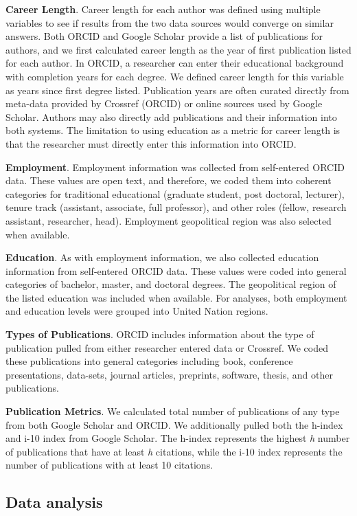 \documentclass[
  english,
  man]{apa6}
\begin{document}
\textbf{Career Length}. Career length for each author was defined using multiple variables to see if results from the two data sources would converge on similar answers. Both ORCID and Google Scholar provide a list of publications for authors, and we first calculated career length as the year of first publication listed for each author. In ORCID, a researcher can enter their educational background with completion years for each degree. We defined career length for this variable as years since first degree listed. Publication years are often curated directly from meta-data provided by Crossref (ORCID) or online sources used by Google Scholar. Authors may also directly add publications and their information into both systems. The limitation to using education as a metric for career length is that the researcher must directly enter this information into ORCID.

\textbf{Employment}. Employment information was collected from self-entered ORCID data. These values are open text, and therefore, we coded them into coherent categories for traditional educational (graduate student, post doctoral, lecturer), tenure track (assistant, associate, full professor), and other roles (fellow, research assistant, researcher, head). Employment geopolitical region was also selected when available.

\textbf{Education}. As with employment information, we also collected education information from self-entered ORCID data. These values were coded into general categories of bachelor, master, and doctoral degrees. The geopolitical region of the listed education was included when available. For analyses, both employment and education levels were grouped into United Nation regions.

\textbf{Types of Publications}. ORCID includes information about the type of publication pulled from either researcher entered data or Crossref. We coded these publications into general categories including book, conference presentations, data-sets, journal articles, preprints, software, thesis, and other publications.

\textbf{Publication Metrics}. We calculated total number of publications of any type from both Google Scholar and ORCID. We additionally pulled both the h-index and i-10 index from Google Scholar. The h-index represents the highest \emph{h} number of publications that have at least \emph{h} citations, while the i-10 index represents the number of publications with at least 10 citations.

\hypertarget{data-analysis}{%
\subsection{Data analysis}\label{data-analysis}}
\end{document}
